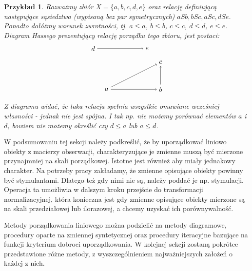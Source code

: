\documentclass[12pt,a4paper]{report}
\newtheorem{example}{Przykład}
\begin{document}
\begin{example}
Rozważmy zbiór $X = \{a,b,c,d,e \}$ oraz relację definiującą następujące sąsiedztwa (wypisaną bez par symetrycznych) $aSb, bSc, aSc, dSe$. Ponadto dołóżmy warunek zwrotności, tj. $a \leq a$, $b \leq b$, $c \leq c$, $d \leq d$, $e \leq e$. Diagram Hassego prezentujący relację porządku tego zbioru, jest postaci:
$$
\begin{tikzpicture}[scale=.7]
  \node (a) at (-2,0) {$a$};
  \node (b) at (2,0) {$b$};
  \node (c) at (2,2) {$c$};
 \node (e) at (1,3) {$e$};
 \node (d) at (-3,3) {$d$};
	\draw [->] (d)--(e);
	\draw [->] (a)--(b);
	\draw [->] (a)--(c);
	\draw [->] (b)--(c);
\end{tikzpicture}
$$
Z diagramu widać, że taka relacja spełnia wszystkie omawiane wcześniej własności - jednak nie jest spójna. I tak np. nie możemy porównać elementów $a$ i $d$, bowiem nie możemy określić czy  $d \leq a$ lub $a \leq d$.
\end{example}



W podsumowaniu tej sekcji należy podkreślić, że by uporządkować liniowo obiekty z macierzy obserwacji, charakteryzujące je zmienne muszą być mierzone przynajmniej na skali porządkowej. Istotne jest również aby miały jednakowy charakter. Na potrzeby pracy zakładamy, że zmienne opisujące obiekty powinny być stymulantami. Dlatego też gdy nimi nie są, należy poddać je np. stymulacji. Operacja ta umożliwia w dalszym kroku przejście do transformacji normalizacyjnej, która konieczna jest gdy zmienne opisujące obiekty mierzone są na skali przedziałowej lub ilorazowej, a chcemy uzyskać ich porównywalność.

Metody porządkowania liniowego można podzielić na metody diagramowe, procedury oparte na zmiennej syntetycznej oraz procedury iteracyjne bazujące na funkcji kryterium dobroci uporządkowania. %
W kolejnej sekcji zostaną pokrótce przedstawione różne metody, z wyszczególnieniem najważniejszych założeń o każdej z nich.
\end{document}
